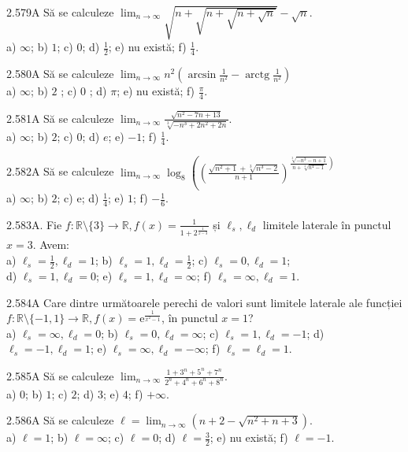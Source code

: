 \documentclass[11pt]{article}
\begin{document}
2.579A Să se calculeze $\lim _{n \rightarrow \infty} \sqrt{n+\sqrt{n+\sqrt{n+\sqrt{n}}}}-\sqrt{n}$.\\ a) $\infty$; b) $1$; c) $0$; d) $\frac{1}{2}$; e) nu există; f) $\frac{1}{4}$.

2.580A Să se calculeze $\lim _{n \rightarrow \infty} n^{2}\left(\arcsin \frac{1}{n^{2}}-\operatorname{arctg} \frac{1}{n^{2}}\right)$\\ a) $\infty$; b) $2$ ; c) $0$ ; d) $\pi$; e) nu există; f) $\frac{\pi}{4}$.

2.581A Să se calculeze $\lim _{n \rightarrow \infty} \frac{\sqrt{n^{2}-7 n+13}}{\sqrt[3]{-n^{3}+2 n^{2}+2 n}}$.\\ a) $\infty$; b) $2$; c) $0$; d) $e$; e) $-1$; f) $\frac{1}{4}$.

2.582A Să se calculeze $\lim _{n \rightarrow \infty} \log _{8}\left(\left(\frac{\sqrt{n^{2}+1}+\sqrt[3]{n^{3}-2}}{n+1}\right)^{\left.\frac{\sqrt[3]{-n^{3}-n+1}}{n+\sqrt[4]{n^{4}-1}}\right)}\right.$\\ a) $\infty$; b) $2$; c) $\mathrm{e}$; d) $\frac{1}{4}$; e) $1$; f) $-\frac{1}{6}$.

2.583A. Fie $f: \mathbb{R} \setminus\{3\} \rightarrow \mathbb{R}, f(x)=\frac{1}{1+2^{\frac{1}{x-3}}}$ și $\ell_{s}, \ell_{d}$ limitele laterale în punctul $x=3$. Avem:\\ a) $\ell_{s}=\frac{1}{2}, \ell_{d}=1$; b) $\ell_{s}=1, \ell_{d}=\frac{1}{2}$; c) $\ell_{s}=0, \ell_{d}=1$;\\ d) $\ell_{s}=1, \ell_{d}=0$; e) $\ell_{s}=1, \ell_{d}=\infty$; f) $\ell_{s}=\infty, \ell_{d}=1$.

2.584A Care dintre următoarele perechi de valori sunt limitele laterale ale funcției $f: \mathbb{R} \setminus\{-1,1\} \rightarrow \mathbb{R}, f(x)=\mathrm{e}^{\frac{1}{x^{2}-1}}$, în punctul $x=1$?\\ a) $\ell_{s}=\infty, \ell_{d}=0$; b) $\ell_{s}=0, \ell_{d}=\infty$; c) $\ell_{s}=1, \ell_{d}=-1$; d) $\ell_{s}=-1, \ell_{d}=1$; e) $\ell_{s}=\infty, \ell_{d}=-\infty$; f) $\ell_{s}=\ell_{d}=1$.

2.585A Să se calculeze $\lim _{n \rightarrow \infty} \frac{1+3^{n}+5^{n}+7^{n}}{2^{n}+4^{n}+6^{n}+8^{n}}$.\\ a) $0$; b) $1$; c) $2$; d) $3$; e) $4$; f) $+\infty$.

2.586A Să se calculeze $\ell=\lim _{n \rightarrow \infty}\left(n+2-\sqrt{n^{2}+n+3}\right)$.\\ a) $\ell=1$; b) $\ell=\infty$; c) $\ell=0$; d) $\ell=\frac{3}{2}$; e) nu există; f) $\ell=-1$.
\end{document}
